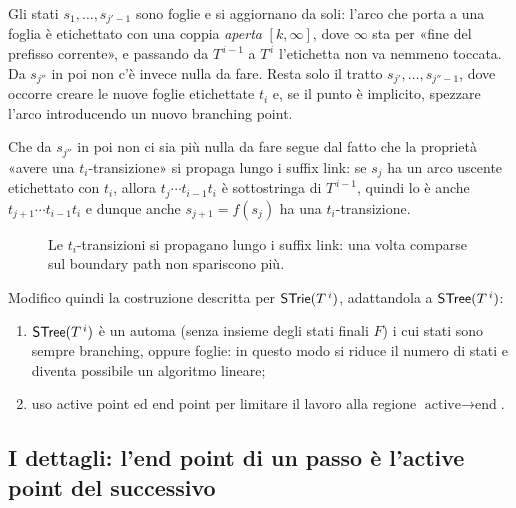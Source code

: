 Gli stati $s_1,\dots,s_{j'-1}$ sono foglie e si aggiornano da soli: l'arco che porta a una
foglia è etichettato con una coppia \emph{aperta} $[k,\infty]$, dove $\infty$ sta per «fine
del prefisso corrente», e passando da $T^{\,i-1}$ a $T^{\,i}$ l'etichetta non va nemmeno
toccata. Da $s_{j''}$ in poi non c'è invece nulla da fare. Resta solo il tratto
$s_{j'},\dots,s_{j''-1}$, dove occorre creare le nuove foglie etichettate $t_i$ e, se il punto
è implicito, spezzare l'arco introducendo un nuovo branching point.

\begin{osservazione}\label{oss:propagazione-ti}
Che da $s_{j''}$ in poi non ci sia più nulla da fare segue dal fatto che la proprietà «avere
una $t_i$-transizione» si propaga lungo i suffix link: se $s_j$ ha un arco uscente etichettato
con $t_i$, allora $t_j\cdots t_{i-1}t_i$ è sottostringa di $T^{\,i-1}$, quindi lo è anche
$t_{j+1}\cdots t_{i-1}t_i$ e dunque anche $s_{j+1}=f(s_j)$ ha una $t_i$-transizione.
\end{osservazione}

\begin{figure}[H]
\centering

\caption{Le $t_i$-transizioni si propagano lungo i suffix link: una volta comparse sul
boundary path non spariscono più.}
\label{fig:propagazione-ti}
\end{figure}

Modifico quindi la costruzione descritta per $\textsf{STrie}{}(T^{\,i})$, adattandola a
$\textsf{STree}{}(T^{\,i})$:
\begin{enumerate}
  \item[1)] $\textsf{STree}{}(T^{\,i})$ è un automa (senza insieme degli stati finali $F$) i cui stati
        sono sempre branching, oppure foglie: in questo modo si riduce il numero di stati e
        diventa possibile un algoritmo lineare;
  \item[2)] uso active point ed end point per limitare il lavoro alla regione
        $\text{active} \longrightarrow \text{end}$.
\end{enumerate}

\subsection[Dettagli: end point e active point]%
{I dettagli: l'end point di un passo è l'active point del successivo}


